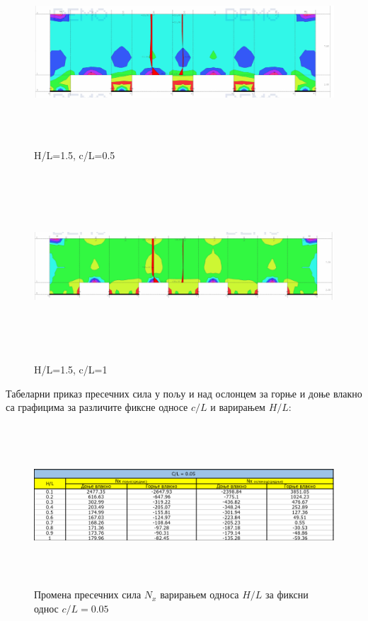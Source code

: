 \documentclass[11pt, a4paper]{article}
\begin{document}
\begin{figure}[H]
	\includegraphics[width=\textwidth, height=7cm]{Slike/H-L_1-5 (0-5).png}
	\caption{H/L=1.5, c/L=0.5}
\end{figure}

\begin{figure}[H]
	\includegraphics[width=\textwidth, height=7cm]{Slike/H-L_1-5 (1-0).png}
	\caption{H/L=1.5, c/L=1}
\end{figure}

Табеларни приказ пресечних сила у пољу и над ослонцем за горње и доње влакно са графицима за различите фиксне односе $c/L$ и варирањем $H/L$:


\begin{figure}[H]
	\includegraphics[width=\textwidth, height=6cm]{Slike/Tabela_0.05.png}
	\caption{Промена пресечних сила $N_x$ варирањем односа $H/L$ за фиксни однос $c/L = 0.05$}
\end{figure}
\end{document}
